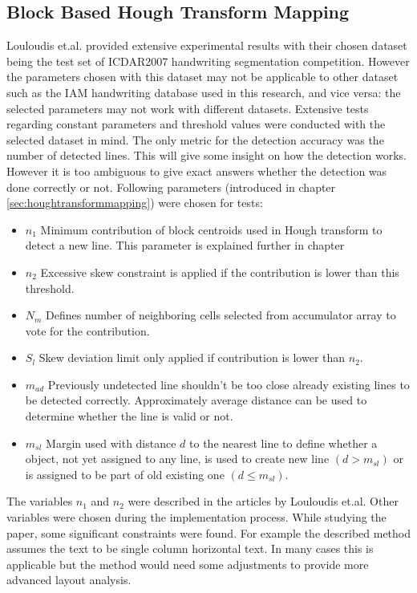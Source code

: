 \documentclass{article}
\begin{document}
    \subsection{Block Based Hough Transform Mapping}
      \label{sec:houghtransformevaluation}
      Louloudis et.al. provided extensive experimental results with their chosen dataset being the test set of ICDAR2007 handwriting segmentation competition. However the parameters chosen with this dataset may not be applicable to other dataset such as the IAM handwriting database used in this research, and vice versa: the selected parameters may not work with different datasets. Extensive tests regarding constant parameters and threshold values were conducted with the selected dataset in mind. The only metric for the detection accuracy was the number of detected lines. This will give some insight on how the detection works. However it is too ambiguous to give exact answers whether the detection was done correctly or not. Following parameters (introduced in chapter \ref{sec:houghtransformmapping}) were chosen for tests:

      \begin{itemize}
        \item $n_1$ Minimum contribution of block centroids used in Hough transform to detect a new line. This parameter is explained further in chapter
        \item $n_2$ Excessive skew constraint is applied if the contribution is lower than this threshold.
        \item $N_m$  Defines number of neighboring cells selected from accumulator array to vote for the contribution.
        \item $S_l$ Skew deviation limit only applied if contribution is lower than $n_2$.
        \item $m_{ad}$ Previously undetected line shouldn't be too close already existing lines to be detected correctly. Approximately average distance can be used to determine whether the line is valid or not.
        \item $m_{sl}$ Margin used with distance $d$ to the nearest line to define whether a object, not yet assigned to any line, is used to create new line $(d > m_{sl})$ or is assigned to be part of old existing one $(d \leq m_{sl})$.
      \end{itemize}

    The variables $n_1$ and $n_2$ were described in the articles by Louloudis et.al. Other variables were chosen during the implementation process. While studying the paper, some significant constraints were found. For example the described method assumes the text to be single column horizontal text. In many cases this is applicable but the method would need some adjustments to provide more advanced layout analysis.
\end{document}
